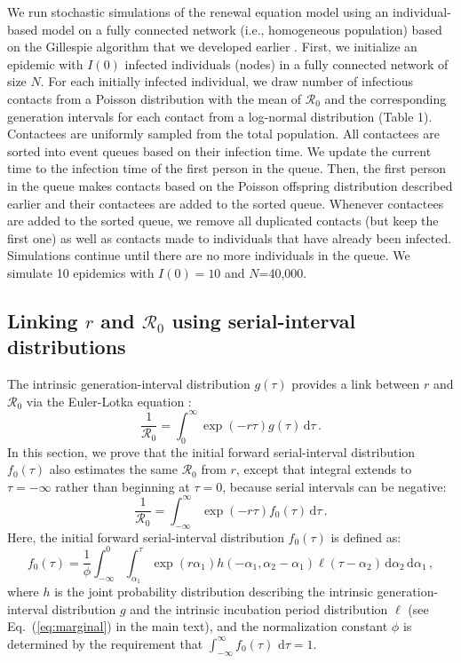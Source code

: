 \documentclass[12pt]{article}
\newcommand{\eref}[1]{Eq.~(\ref{eq:#1})}
\newcommand{\Rx}[1]{\ensuremath{{\mathcal R}_{#1}}\xspace}
\newcommand{\Ro}{\Rx{0}}
\newcommand{\dd}[1]{\ensuremath{\, \mathrm{d}#1}}
\newcommand{\dtau}{\dd{\tau}}
\newcommand{\gdist}{g} %
\newcommand{\idist}{\ell} %
\begin{document}
We run stochastic simulations of the renewal equation model using an individual-based model on a fully connected network (i.e., homogeneous population) based on the Gillespie algorithm that we developed earlier \citep{park2020inferring}.
First, we initialize an epidemic with $I(0)$ infected individuals (nodes) in a fully connected network of size $N$. 
For each initially infected individual, we draw number of infectious contacts from a Poisson distribution with the mean of \Ro and the corresponding generation intervals for each contact from a log-normal distribution (Table 1).
Contactees are uniformly sampled from the total population.
All contactees are sorted into event queues based on their infection time.
We update the current time to the infection time of the first person in the queue.
Then, the first person in the queue makes contacts based on the Poisson offspring distribution described earlier and their contactees are added to the sorted queue.
Whenever contactees are added to the sorted queue, we remove all duplicated contacts (but keep the first one) as well as contacts made to individuals that have already been infected.
Simulations continue until there are no more individuals in the queue.
We simulate 10 epidemics with $I(0)=10$ and $N$=40,000.

\subsection{Linking $r$ and \Ro using serial-interval distributions}

The intrinsic generation-interval distribution $\gdist(\tau)$ provides a link between $r$ and \Ro via the Euler-Lotka equation \citep{wallinga2007generation}:
\begin{equation}
\frac{1}{\Ro} = \int_0^\infty \exp(-r\tau) \gdist(\tau) \dtau\,.
\end{equation}
In this section, we prove that the initial forward serial-interval distribution $f_0(\tau)$ also estimates the same \Ro from $r$, except that integral extends to $\tau=-\infty$ rather than beginning at $\tau=0$, because serial intervals can be negative:
\begin{equation}
\frac{1}{\Ro} = \int_{-\infty}^\infty \exp(-r\tau) f_{0}(\tau) \dtau\,.
\label{eq:ptarget}
\end{equation}
Here, the initial forward serial-interval distribution $f_{0}(\tau)$ is defined as:
\begin{equation}
f_{0}(\tau) = \frac{1}{\phi} \int_{-\infty}^{0} \int_{\alpha_1}^{\tau} \exp(r \alpha_1) h(-\alpha_1, \alpha_2 - \alpha_1) \idist(\tau - \alpha_2) \, \mathrm{d}\alpha_2\,\mathrm{d}\alpha_1\,,
\label{eq:fdist}
\end{equation}
where $h$ is the joint probability distribution describing the
intrinsic generation-interval distribution $g$ and the intrinsic
incubation period distribution $\idist$ (see \eref{marginal} in the
main text), and the normalization constant $\phi$ is determined by the
requirement that $\int_{-\infty}^\infty f_{0}(\tau)\,\dtau=1$.
\end{document}
